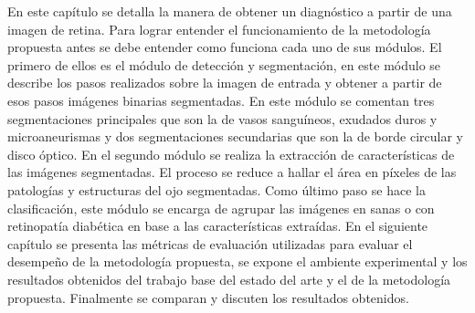 En este capítulo se detalla la manera de obtener un diagnóstico a partir de una imagen de retina. Para lograr entender el funcionamiento de la metodología propuesta antes se debe entender como funciona cada uno de sus módulos. El primero de ellos es el módulo de detección y segmentación, en este módulo se describe los pasos realizados sobre la imagen de entrada y obtener a partir de esos pasos imágenes binarias segmentadas. En este módulo se comentan tres segmentaciones principales que son la de vasos sanguíneos, exudados duros y microaneurismas y dos segmentaciones secundarias que son  la de borde circular y disco óptico.
 En el segundo módulo se realiza la extracción de características de las imágenes segmentadas. El proceso se reduce a hallar el área en píxeles de las patologías y estructuras del ojo segmentadas.
 Como último paso se hace la clasificación, este módulo se encarga de agrupar las imágenes en sanas o con retinopatía diabética en base a las características extraídas. 
En el siguiente capítulo se presenta las métricas de evaluación utilizadas para evaluar el desempeño de la metodología propuesta, se expone el ambiente experimental y los resultados obtenidos del trabajo base del estado del arte y el de la metodología propuesta. Finalmente se comparan y discuten los resultados obtenidos.